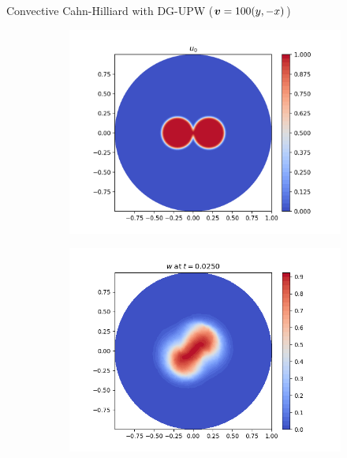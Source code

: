 \begin{frame}{Convective Cahn-Hilliard with DG-UPW \small{($\boldsymbol{v}=100(y,-x)$)}}
	\vspace{-0.3cm}
	\begin{figure}[t]
		\begin{subfigure}{0.49\textwidth}
			\centering
			\includegraphics[scale=0.28]{img/convective-cahn-hilliard/u0.png}
		\end{subfigure}
		\hspace*{-1.5cm}
		\begin{subfigure}{0.49\textwidth}
			\centering
			\includegraphics[scale=0.28]{img/convective-cahn-hilliard/w_DG-UPW+Eyre_nt-100_t-0.02500_P0_adv-100.0_nx-50.png}
		\end{subfigure}

\end{figure}
\end{frame}
